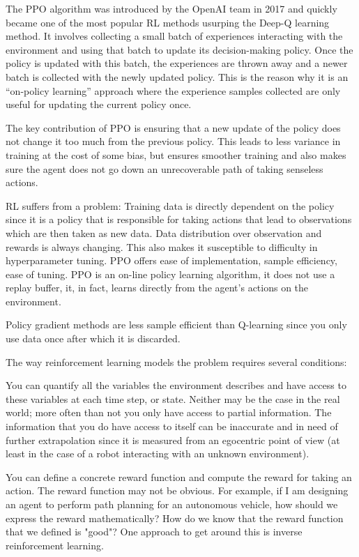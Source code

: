 \documentclass[conference]{IEEEtran}
\begin{document}
The PPO algorithm was introduced by the OpenAI team in 2017 and quickly became one of the most popular RL methods usurping the Deep-Q learning method. It involves collecting a small batch of experiences interacting with the environment and using that batch to update its decision-making policy. Once the policy is updated with this batch, the experiences are thrown away and a newer batch is collected with the newly updated policy. This is the reason why it is an “on-policy learning” approach where the experience samples collected are only useful for updating the current policy once.

The key contribution of PPO is ensuring that a new update of the policy does not change it too much from the previous policy. This leads to less variance in training at the cost of some bias, but ensures smoother training and also makes sure the agent does not go down an unrecoverable path of taking senseless actions.

RL suffers from a problem: Training data is directly dependent on the policy since it is a policy that is responsible for taking actions that lead to observations which are then taken as new data. Data distribution over observation and rewards is always changing. This also makes it susceptible to difficulty in hyperparameter tuning. PPO offers ease of implementation, sample efficiency, ease of tuning. PPO is an on-line policy learning algorithm, it does not use a replay buffer, it, in fact,  learns directly from the agent’s actions on the environment.

Policy gradient methods are less sample efficient than Q-learning since you only use data once after which it is discarded.

The way reinforcement learning models the problem requires several conditions:

You can quantify all the variables the environment describes and have access to these variables at each time step, or state. Neither may be the case in the real world; more often than not you only have access to partial information. The information that you do have access to itself can be inaccurate and in need of further extrapolation since it is measured from an egocentric point of view (at least in the case of a robot interacting with an unknown environment).

You can define a concrete reward function and compute the reward for taking an action. The reward function may not be obvious. For example, if I am designing an agent to perform path planning for an autonomous vehicle, how should we express the reward mathematically? How do we know that the reward function that we defined is "good"? One approach to get around this is inverse reinforcement learning.
\end{document}

